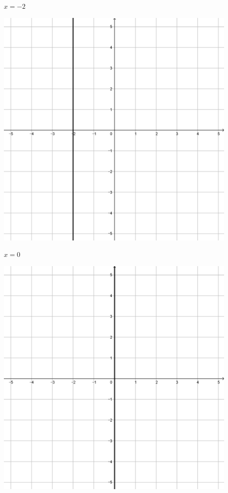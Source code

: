 \documentclass[a4paper]{oblivoir}
\begin{document}
\begin{minipage}{0.45\textwidth}\centering
\(x=-2\)
\par\bigskip\includegraphics[width=0.9\textwidth]{img/1_line_33}
\end{minipage}
\begin{minipage}{0.45\textwidth}\centering
\(x=0\)
\par\bigskip\includegraphics[width=0.9\textwidth]{img/1_line_34}
\end{minipage}\bigskip\bigskip\par
\end{document}
